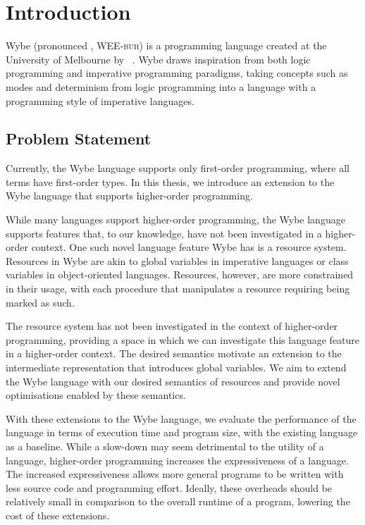 \clearpage

\def\chaptertitle{Introduction}

\lhead{\emph{\chaptertitle}}

\chapter{\chaptertitle}
\label{ch:introduction}

Wybe (pronounced \ipa{["wi.b\textschwa]}, \textsc{WEE-buh}) is a programming language created at the University of Melbourne by \supname~\cite{schachte2015wybe}. Wybe draws inspiration from both logic programming and imperative programming paradigms, taking concepts such as modes and determinism from logic programming into a language with a programming style of imperative languages.

\section{Problem Statement}
\label{sec:problem-statement}

Currently, the Wybe language supports only first-order programming, where all terms have first-order types. In this thesis, we introduce an extension to the Wybe language that supports higher-order programming.

While many languages support higher-order programming, the Wybe language supports features that, to our knowledge, have not been investigated in a higher-order context. One such novel language feature Wybe has is a resource system. Resources in Wybe are akin to global variables in imperative languages or class variables in object-oriented languages. Resources, however, are more constrained in their usage, with each procedure that manipulates a resource requiring being marked as such. 

The resource system has not been investigated in the context of higher-order programming, providing a space in which we can investigate this language feature in a higher-order context. The desired semantics motivate an extension to the intermediate representation that introduces global variables. We aim to extend the Wybe language with our desired semantics of resources and provide novel optimisations enabled by these semantics. 

With these extensions to the Wybe language, we evaluate the performance of the language in terms of execution time and program size, with the existing language as a baseline. While a slow-down may seem detrimental to the utility of a language, higher-order programming increases the expressiveness of a language. The increased expressiveness allows more general programs to be written with less source code and programming effort. Ideally, these overheads should be relatively small in comparison to the overall runtime of a program, lowering the cost of these extensions.


